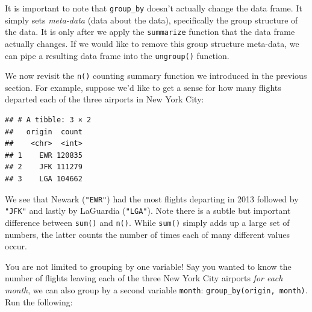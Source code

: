 \documentclass[]{tufte-book}
\newenvironment{Shaded}{\begin{snugshade}}{\end{snugshade}}
\newcommand{\KeywordTok}[1]{\textcolor[rgb]{0.13,0.29,0.53}{\textbf{{#1}}}}
\newcommand{\DataTypeTok}[1]{\textcolor[rgb]{0.13,0.29,0.53}{{#1}}}
\newcommand{\StringTok}[1]{\textcolor[rgb]{0.31,0.60,0.02}{{#1}}}
\newcommand{\NormalTok}[1]{{#1}}
\begin{document}
It is important to note that \texttt{group\_by} doesn't actually change
the data frame. It simply sets \emph{meta-data} (data about the data),
specifically the group structure of the data. It is only after we apply
the \texttt{summarize} function that the data frame actually changes. If
we would like to remove this group structure meta-data, we can pipe a
resulting data frame into the \texttt{ungroup()} function.

We now revisit the \texttt{n()} counting summary function we introduced
in the previous section. For example, suppose we'd like to get a sense
for how many flights departed each of the three airports in New York
City:

\begin{Shaded}
\end{Shaded}

\begin{verbatim}
## # A tibble: 3 × 2
##   origin  count
##    <chr>  <int>
## 1    EWR 120835
## 2    JFK 111279
## 3    LGA 104662
\end{verbatim}

We see that Newark (\texttt{"EWR"}) had the most flights departing in
2013 followed by \texttt{"JFK"} and lastly by LaGuardia
(\texttt{"LGA"}). Note there is a subtle but important difference
between \texttt{sum()} and \texttt{n()}. While \texttt{sum()} simply
adds up a large set of numbers, the latter counts the number of times
each of many different values occur.

You are not limited to grouping by one variable! Say you wanted to know
the number of flights leaving each of the three New York City airports
\emph{for each month}, we can also group by a second variable
\texttt{month}: \texttt{group\_by(origin,\ month)}. Run the following:

\begin{Shaded}
\end{Shaded}
\end{document}
